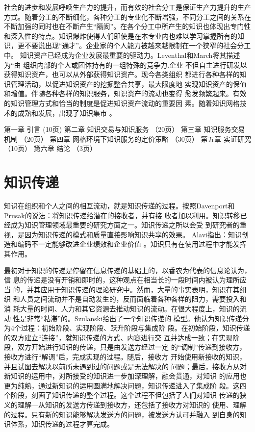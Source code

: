 \documentclass[12pt,a4paper]{ctexart}
\begin{document}
社会的进步和发展呼唤生产力的提升，而有效的社会分工是保证生产力提升的生产方式。随着分工的不断细化，各种分工的专业化不断增强，不同分工之间的关系在不断加强的同时也在不断产生“隔阂”。在各个分工中所产生的知识也体现出专门性和深入性的特点。知识爆炸使得人们即使是在本专业内也难以学习掌握所有的知识，更不要说出现“通才”。企业家的个人能力被越来越限制在一个狭窄的社会分工中。
知识资产已经成为企业发展最重要的驱动力。Leventhal和March将其描述为“由
组织内部的个人或团体持有的一组特殊的竞争力\cite{levinthal1993ml}.企业
不但自主进行研发以获得知识资产，也可以从外部获得知识资产。现今各类组织
都进行各种各样的知识管理活动，以促进知识资产的挖掘整合共享，最大限度地
实现知识资产的保值和增值。伴随各种各样的知识服务，知识资产的流动也变得
愈发频繁起来。有效的知识管理方式和恰当的制度是促进知识资产流动的重要因
素。随着知识网格技术的成熟和发展，出现了知识集市 。\cite{Andreas2007}

第一章	引言 (10页)
第二章	知识交易与知识服务 （20页）
第三章	知识服务交易机制  （20页）
第四章	网格环境下知识服务的定价策略 （30页）
第五章	实证研究 （10页）
第六章	结论  （3页）

\section{知识传递}
知识在组织和个人之间的相互流动，就是知识传递的过程。按照Davenport和
Prusak\cite{davenport1998wko}的说法：将知识传递给潜在的接收者，并有接
收者加以利用。知识转移已经成为知识管理领域最重要的研究方面之一。知识传递之所以会受
到研究者的重视，是因为知识传递的模式和质量直接影响知识共享的效果。
Alavi指出：知识创造和编码不一定能够改进企业绩效和企业价值
\cite{alavi2000mok}。知识只有在使用过程中才能发挥其作用。

最初对于知识的传递是停留在信息传递的基础上的，以香农\cite{Shannon1949}为代表的信息论认为，信
息的传递是没有开销和即时的，这种观点在相当长的一段时间内被认为理所应当
的，并其应用于知识传递的理论研究中。然而，大量的事实表明，知识在其组织
和人员之间流动并不是自动发生的，反而面临着各种各样的阻力，需要投入和消
耗大量的时间、人力和其它资源去推动知识的流动。在很大程度上，知识的流动
性是非常“粘滞”的。Szulanski\cite{szulanski2000pkt}给出了一个知识传递的
模型。他认为知识传递分为4个过程：初始阶段、实现阶段、跃升阶段与集成阶
段。在初始阶段，知识传递的双方建立“连接”，就知识传递的方式、内容进行交
互并达成一致；在实现阶段，双方开始进行知识的传递，只是由发送方经过一定
的“调制”传递到接收方，接收方进行“解调”后，完成实现的过程。随后，接收方
开始使用新接收的知识，并且试图去解决以前所未遇到过的问题或是无法解决的
问题；最后，接收方从对新知识的运用中，对所接受的知识进一步加深理解，融会贯通，对知识
的应用也更为纯熟，通过新知识的运用圆满地解决问题，知识传递进入了集成阶
段。这四个阶段，刻画了知识传递的整个过程。这个过程不但包括了人们对知识
传递的狭义的理解---从知识的发送方传递到接收方，还包括了接收方对知识的
使用、理解的过程。只有新的知识能够解决发送方的问题，被发送方认可并融入
到自身的知识体系，知识传递的过程才算完成。
\end{document}
